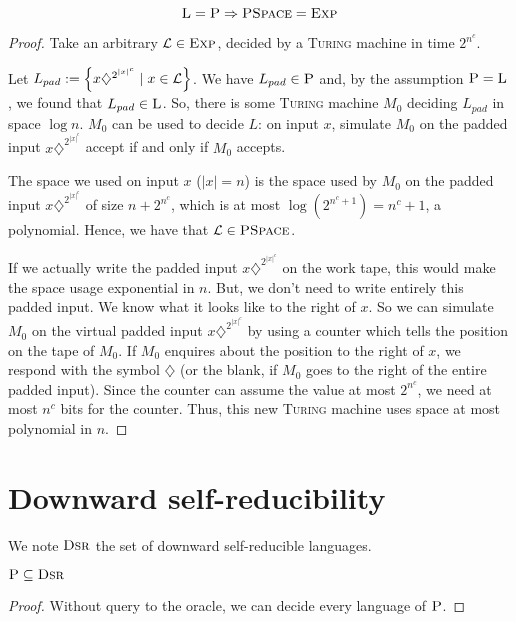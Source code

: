 \begin{thm}
    $$\LogSpace=\P \Rightarrow \pSpace = \Exp$$
\end{thm}
\begin{proof}
Take an arbitrary $\L \in \Exp$, decided by a \textsc{Turing} machine in time $2^{n^c}$.

Let $L_{pad}:=\set{x\diamondsuit^{2^{\lvert x \rvert^c}} \mid x \in \L}$. We have $L_{pad} \in \P$ and, by the assumption $\P=\LogSpace$, we found that $L_{pad} \in \LogSpace$. So, there is some \textsc{Turing} machine $M_0$ deciding $L_{pad}$ in space $\log n$. $M_0$ can be used to decide $L$: on input $x$, simulate $M_0$ on the padded input $x\diamondsuit^{2^{\lvert x \rvert^c}}$ accept if and only if $M_0$ accepts.

The space we used on input $x$ ($\vert x\vert=n$) is the space used by $M_0$ on the padded input $x\diamondsuit^{2^{\lvert x \rvert^c}}$ of size $n + 2^{n^c}$, which is at most $\log\left(2^{n^c+1}\right) = n^c + 1$, a polynomial. Hence, we have that $\L \in \pSpace$. 

If we actually write the padded input $x\diamondsuit^{2^{\lvert x \rvert^c}}$ on the work tape, this would make the space usage exponential in $n$. But, we don't need to write entirely this padded input. We know what it looks like to the right of $x$. So we can simulate $M_0$ on the virtual padded input $x\diamondsuit^{2^{\lvert x \rvert^c}}$ by using a counter which tells the position on the tape of $M_0$. If $M_0$ enquires about the position to the right of $x$, we respond with the symbol $\diamondsuit$ (or the blank, if $M_0$ goes to the right of the entire padded input). Since the counter can assume the value at most $2^{n^c}$, we need at most $n^c$ bits for the counter. Thus, this new \textsc{Turing} machine uses space at most polynomial in $n$.
\end{proof}

\section{Downward self-reducibility}

\begin{notation}
    We note $\textsc{Dsr}$ the set of downward self-reducible languages.
\end{notation}

\begin{propo}
    $\P \subseteq \textsc{Dsr}$
\end{propo}
\begin{proof}
    Without query to the oracle, we can decide every language of $\P$.
\end{proof}

